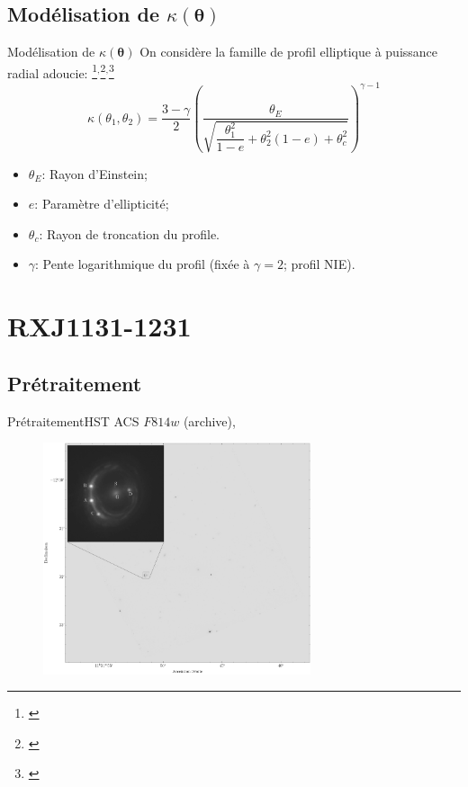 \documentclass{beamer}
\begin{document}
\subsection{Modélisation de $\kappa(\boldsymbol{ \theta} )$}
\begin{frame}{Modélisation de $\kappa(\boldsymbol{ \theta} )$}
On considère la famille de profil elliptique à puissance radial adoucie:
\footnote{\citet{Barkana1998}}$^{,}$\footnote{\citet{Suyu2013}}$^{,}$\footnote{\citet{Keeton2001}}
\begin{equation}\label{eq:Kappa} 
        \kappa(\theta_1, \theta_2) = \frac{3 - \gamma}{2} 
        \left( \frac{\theta_E}{\sqrt{\dfrac{\theta_1^2}{1 - e} + \theta_2^2(1-e) + 
        \theta_c^2}} \right)^{\gamma-1}
\end{equation} 
\begin{itemize}
        \item $\theta_E$: Rayon d'Einstein;
        \item $e$: Paramètre d'ellipticité;
        \item $\theta_c$: Rayon de troncation du profile.
        \item $\gamma$: Pente logarithmique du profil (fixée à $\gamma=2$; profil NIE).
\end{itemize}
\end{frame}

\section{RXJ1131-1231}
\subsection{Prétraitement}
\begin{frame}{Prétraitement}{HST ACS $F814w$ (archive), \citet{Sluse2003}}
        \begin{figure}[H]
                \centering
                \includegraphics[width=0.7\textwidth]{wide_field_and_zoom}
        \end{figure}
\end{frame}
\end{document}
